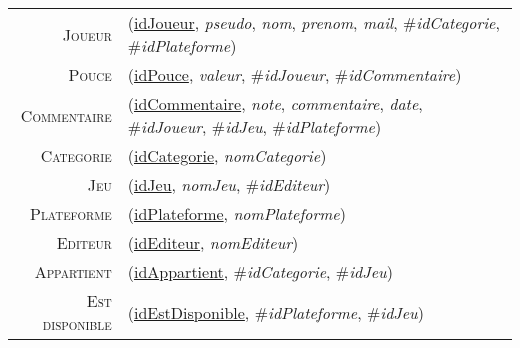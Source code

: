 \documentclass{article}
\newenvironment{mld}
{\par\begin{minipage}{\linewidth}\begin{tabular}{rp{\linewidth}}}
{\end{tabular}\end{minipage}\par}
\newcommand{\relat}[1]{\textsc{#1}}
\newcommand{\attr}[1]{\emph{#1}}
\newcommand{\prim}[1]{\uline{#1}}
\newcommand{\foreign}[1]{\#\textsl{#1}}
\begin{document}
\begin{mld}
  \relat{Joueur} & (\prim{idJoueur}, \attr{pseudo}, \attr{nom}, \attr{prenom}, \attr{mail}, \foreign{idCategorie}, \foreign{idPlateforme})\\
  \relat{Pouce} & (\prim{idPouce}, \attr{valeur}, \foreign{idJoueur}, \foreign{idCommentaire})\\
  \relat{Commentaire} & (\prim{idCommentaire}, \attr{note}, \attr{commentaire}, \attr{date}, \foreign{idJoueur}, \foreign{idJeu}, \foreign{idPlateforme})\\
  \relat{Categorie} & (\prim{idCategorie}, \attr{nomCategorie})\\
  \relat{Jeu} & (\prim{idJeu}, \attr{nomJeu}, \foreign{idEditeur})\\
  \relat{Plateforme} & (\prim{idPlateforme}, \attr{nomPlateforme})\\
  \relat{Editeur} & (\prim{idEditeur}, \attr{nomEditeur})\\
  \relat{Appartient} & (\prim{idAppartient}, \foreign{idCategorie}, \foreign{idJeu})\\
  \relat{Est disponible} & (\prim{idEstDisponible}, \foreign{idPlateforme}, \foreign{idJeu})\\
\end{mld}
\end{document}

